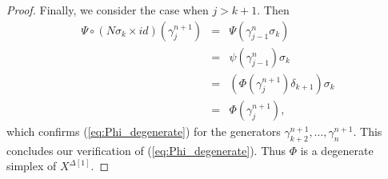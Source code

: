 \begin{proof}
Finally, we consider the case when $j>k+1$. Then
\begin{displaymath}
\begin{array}{rcl}
\Psi \circ (N\sigma _k\times id)(\gamma ^{n+1}_j) & = & \Psi (\gamma ^n_{j-1}\sigma _k) \\
& = & \psi (\gamma ^n_{j-1})\sigma _k \\
& = & (\Phi (\gamma ^{n+1}_j)\delta _{k+1})\sigma _k \\
& = & \Phi (\gamma ^{n+1}_j),
\end{array}
\end{displaymath}
which confirms (\ref{eq:Phi_degenerate}) for the generators $\gamma ^{n+1}_{k+2}, \dots ,\gamma ^{n+1}_n$. This concludes our verification of (\ref{eq:Phi_degenerate}). Thus $\Phi$ is a degenerate simplex of $X^{\Delta [1]}$.
\end{proof}


